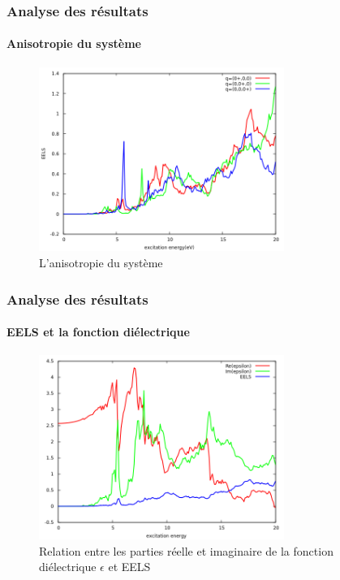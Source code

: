 \documentclass[french]{beamer}
\begin{document}
\begin{frame}
\frametitle{Analyse des résultats}
\framesubtitle{Anisotropie du système}
\begin{figure}[!h]
    \centering
    \includegraphics[width=8cm]{anisotropy}
    \caption{L'anisotropie du système}\label{fig-anisotropie}
\end{figure}

\end{frame}

\begin{frame}
\frametitle{Analyse des résultats}
\framesubtitle{EELS et la fonction diélectrique}
\begin{figure}[!h]
    \centering
    \includegraphics[width=8cm]{epsilon_compare}
    \caption{Relation entre les parties réelle et imaginaire de la fonction diélectrique $\epsilon$ et EELS}\label{fig-epsilon_compare}
\end{figure}

\end{frame}
\end{document}
